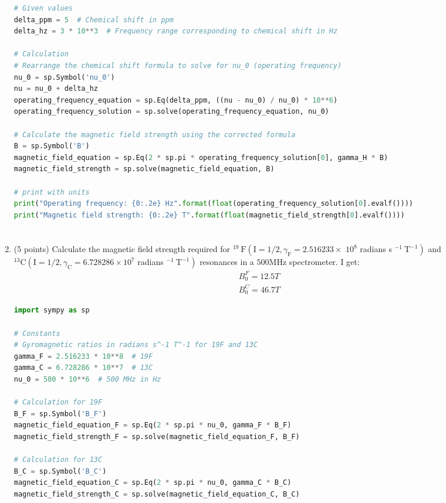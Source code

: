 \documentclass[12pt]{article}
\begin{document}
\begin{enumerate}
\begin{lstlisting}[language=Python]
# Given values
delta_ppm = 5  # Chemical shift in ppm
delta_hz = 3 * 10**3  # Frequency range corresponding to chemical shift in Hz

# Calculation
# Rearrange the chemical shift formula to solve for nu_0 (operating frequency)
nu_0 = sp.Symbol('nu_0')
nu = nu_0 + delta_hz
operating_frequency_equation = sp.Eq(delta_ppm, ((nu - nu_0) / nu_0) * 10**6)
operating_frequency_solution = sp.solve(operating_frequency_equation, nu_0)

# Calculate the magnetic field strength using the corrected formula
B = sp.Symbol('B')
magnetic_field_equation = sp.Eq(2 * sp.pi * operating_frequency_solution[0], gamma_H * B)
magnetic_field_strength = sp.solve(magnetic_field_equation, B)

# print with units
print("Operating frequency: {0:.2e} Hz".format(float(operating_frequency_solution[0].evalf())))
print("Magnetic field strength: {0:.2e} T".format(float(magnetic_field_strength[0].evalf())))

\end{lstlisting}
\section{}
  \item (5 points) Calculate the magnetic field strength required for ${ }^{19} \mathrm{~F}\left(\mathrm{I}=1 / 2, \gamma_{\mathrm{F}}=2.516233 \times\right.$ $10^{8}$ radians s $\left.^{-1} \mathrm{~T}^{-1}\right)$ and ${ }^{13} \mathrm{C}\left(\mathrm{I}=1 / 2, \gamma_{\mathrm{C}}=6.728286 \times 10^{7}\right.$ radians $\left.^{-1} \mathrm{~T}^{-1}\right)$ resonances in a $500 \mathrm{MHz}$ spectrometer.
  I get:
\begin{align}
  B_{0}^{F} = 12.5 T\\
  B_{0}^{C} = 46.7 T
\end{align}
\begin{lstlisting}[language=Python]
import sympy as sp

# Constants
# Gyromagnetic ratios in radians s^-1 T^-1 for 19F and 13C
gamma_F = 2.516233 * 10**8  # 19F
gamma_C = 6.728286 * 10**7  # 13C
nu_0 = 500 * 10**6  # 500 MHz in Hz

# Calculation for 19F
B_F = sp.Symbol('B_F')
magnetic_field_equation_F = sp.Eq(2 * sp.pi * nu_0, gamma_F * B_F)
magnetic_field_strength_F = sp.solve(magnetic_field_equation_F, B_F)

# Calculation for 13C
B_C = sp.Symbol('B_C')
magnetic_field_equation_C = sp.Eq(2 * sp.pi * nu_0, gamma_C * B_C)
magnetic_field_strength_C = sp.solve(magnetic_field_equation_C, B_C)


\end{lstlisting}
\end{enumerate}
\end{document}
